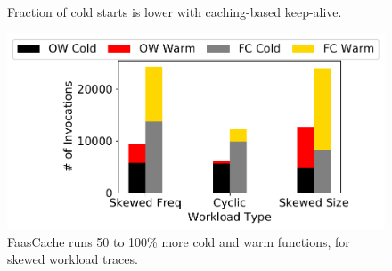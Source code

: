 \begin{figure}[t]
  \centering
  \begin{minipage}[c]{0.7\linewidth}
  \hfill
  \hfill
    \vspace*{\myfigspace}
    \caption[cold starts]{Fraction of cold starts is lower with caching-based keep-alive. } %
      \vspace*{\myfigspace}
      \label{fig:cold starts-all}
    \end{minipage}
    \hfill
    \begin{minipage}[c]{0.29\linewidth}
      \includegraphics[width=1\textwidth]{../graphs/litmus_tests/litmus_2_stacked.pdf}
      \caption{FaasCache runs 50 to 100\% more cold and warm functions, for skewed workload traces.}
              \label{fig:litmus_2}
    \end{minipage}
\end{figure}


